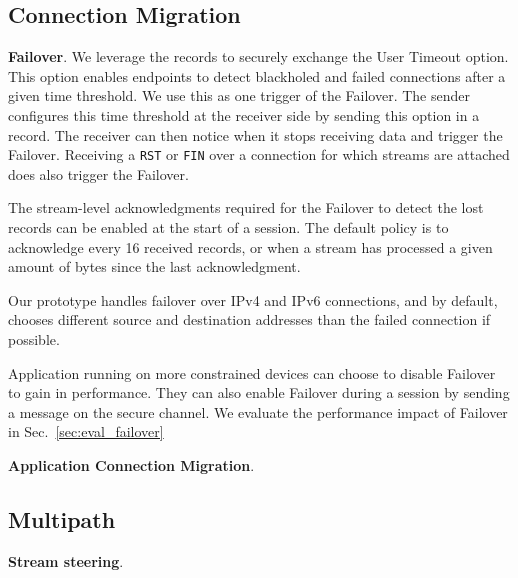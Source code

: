 
\subsection{Connection Migration}
\label{sec:prot-migration}

\textbf{Failover}.
We leverage the \tcpls records to securely exchange the \tcp User Timeout option.
This option enables endpoints to detect blackholed and failed \tcp connections
after a given time threshold. We use this as one trigger of the Failover. The 
sender configures this time threshold at the receiver side by sending this \tcp 
option in a \tcpls record. The receiver can then notice when it stops receiving 
data and trigger the Failover.
Receiving a \tcp \texttt{RST} or \texttt{FIN} over a \tcp connection for which
\tcpls streams are attached does also trigger the Failover.

The stream-level acknowledgments required for the Failover to detect the lost
\tcpls records can be enabled at the start of a \tcpls session. The default
policy is to acknowledge every 16 received records, or when a
stream has processed 
a given amount of 
bytes since the last acknowledgment. 

Our prototype handles failover over IPv4 and IPv6 \tcp connections, and by default, chooses different source and destination addresses than the failed \tcp connection if possible.

Application running on more constrained devices can choose to disable Failover
to gain in performance. They can also enable Failover during a \tcpls session 
by sending a message on the secure channel. 
We evaluate the performance impact of Failover in Sec.~\ref{sec:eval_failover}

\textbf{Application Connection Migration}.

\subsection{Multipath}
\label{sec:prot-multipath}

\textbf{Stream steering}.


